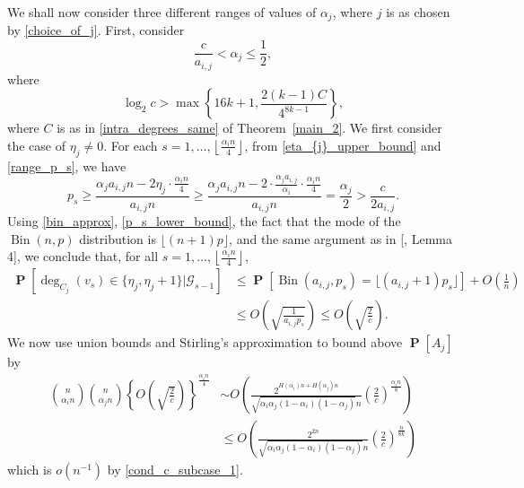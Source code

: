 \documentclass[11pt,reqno]{amsart}
\theoremstyle{definition}
\theoremstyle{remark}
\theoremstyle{conjecture}
\DeclareMathOperator{\Prob}{\mathbf{P}}
\DeclareMathOperator{\bin}{Bin}
\begin{document}
We shall now consider three different ranges of values of $\alpha_{j}$, where $j$ is as chosen by \eqref{choice_of_j}. First, consider
\begin{equation}\label{range_1}
\frac{c}{a_{i,j}} < \alpha_{j} \leqslant \frac{1}{2},
\end{equation}
where 
\begin{equation}\label{cond_c_subcase_1}
\log_{2}c > \max\left\{16k + 1, \frac{2(k-1)C}{4^{8k-1}}\right\},
\end{equation}
where $C$ is as in \ref{intra_degrees_same} of Theorem~\ref{main_2}. We first consider the case of $\eta_{j} \neq 0$. For each $s = 1, \ldots, \left\lfloor\frac{\alpha_{i} n}{4}\right\rfloor$, from \eqref{eta_{j}_upper_bound} and \eqref{range_p_s}, we have
\begin{equation}\label{p_s_lower_bound}
p_{s} \geqslant \frac{\alpha_{j} a_{i,j} n - 2 \eta_{j} \cdot \frac{\alpha_{i} n}{4}}{a_{i,j} n} \geqslant \frac{\alpha_{j} a_{i,j} n - 2 \cdot \frac{\alpha_{j} a_{i,j}}{\alpha_{i}} \cdot \frac{\alpha_{i} n}{4}}{a_{i,j} n} = \frac{\alpha_{j}}{2} > \frac{c}{2 a_{i,j}}.
\end{equation}
Using \eqref{bin_approx}, \eqref{p_s_lower_bound}, the fact that the mode of the $\bin(n, p)$ distribution is $\lfloor (n+1)p \rfloor$, and the same argument as in [\cite{09}, Lemma 4], we conclude that, for all $s = 1, \ldots, \left\lfloor\frac{\alpha_{i} n}{4}\right\rfloor$, 
\begin{align}\label{each_deg_probab_lower_bound_subcase_1}
\Prob\left[\deg_{C_{j}}(v_{s}) \in \{\eta_{j}, \eta_{j}+1\}\Big|\mathcal{G}_{s-1}\right] &\leqslant \Prob\left[\bin\left(a_{i,j}, p_{s}\right) = \lfloor (a_{i,j} + 1) p_{s}\rfloor\right] + O\left(\frac{1}{n}\right) \nonumber\\
&\leqslant O\left(\sqrt{\frac{1}{a_{i,j} p_{s}}}\right) \leqslant O\left(\sqrt{\frac{2}{c}}\right).
\end{align}
We now use union bounds and Stirling's approximation to bound above $\Prob[A_{j}]$ by
\begin{align}
{n \choose \alpha_{i}n} {n \choose \alpha_{j}n} \left\{O\left(\sqrt{\frac{2}{c}}\right)\right\}^{\frac{\alpha_{i} n}{4}} &\sim O\left(\frac{2^{H(\alpha_{i})n + H(\alpha_{j})n}}{\sqrt{\alpha_{i} \alpha_{j} (1-\alpha_{i}) (1-\alpha_{j})} n} \left(\frac{2}{c}\right)^{\frac{\alpha_{i} n}{8}}\right) \nonumber\\
&\leqslant O\left(\frac{2^{2n}}{\sqrt{\alpha_{i} \alpha_{j} (1-\alpha_{i}) (1-\alpha_{j})} n} \left(\frac{2}{c}\right)^{\frac{n}{8k}}\right) \nonumber
\end{align}
which is $o(n^{-1})$ by \eqref{cond_c_subcase_1}. 
\end{document}
